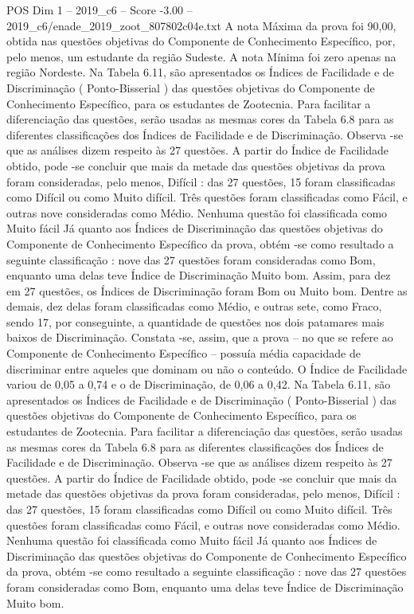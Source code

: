\begin{textsample}{POS Dim 1 – 2019\_c6 – Score -3.00 – 2019\_c6/enade\_2019\_zoot\_807802c04e.txt}
A nota Máxima da prova foi 90,00, obtida nas questões objetivas do Componente de Conhecimento Específico, por, pelo menos, um estudante da região Sudeste.
A nota Mínima foi zero apenas na região Nordeste.
Na Tabela 6.11, são apresentados os Índices de Facilidade e de Discriminação ( Ponto-Bisserial ) das questões objetivas do Componente de Conhecimento Específico, para os estudantes de Zootecnia.
Para facilitar a diferenciação das questões, serão usadas as mesmas cores da Tabela 6.8 para as diferentes classificações dos Índices de Facilidade e de Discriminação.
Observa -se que as análises dizem respeito às 27 questões.
A partir do Índice de Facilidade obtido, pode -se concluir que mais da metade das questões objetivas da prova foram consideradas, pelo menos, Difícil : das 27 questões, 15 foram classificadas como Difícil ou como Muito difícil.
Três questões foram classificadas como Fácil, e outras nove consideradas como Médio.
Nenhuma questão foi classificada como Muito fácil Já quanto aos Índices de Discriminação das questões objetivas do Componente de Conhecimento Específico da prova, obtém -se como resultado a seguinte classificação : nove das 27 questões foram consideradas como Bom, enquanto uma delas teve Índice de Discriminação Muito bom.
Assim, para dez em 27 questões, os Índices de Discriminação foram Bom ou Muito bom.
Dentre as demais, dez delas foram classificadas como Médio, e outras sete, como Fraco, sendo 17, por conseguinte, a quantidade de questões nos dois patamares mais baixos de Discriminação.
Constata -se, assim, que a prova – no que se refere ao Componente de Conhecimento Específico – possuía média capacidade de discriminar entre aqueles que dominam ou não o conteúdo.
O Índice de Facilidade variou de 0,05 a 0,74 e o de Discriminação, de 0,06 a 0,42.
Na Tabela 6.11, são apresentados os Índices de Facilidade e de Discriminação ( Ponto-Bisserial ) das questões objetivas do Componente de Conhecimento Específico, para os estudantes de Zootecnia.
Para facilitar a diferenciação das questões, serão usadas as mesmas cores da Tabela 6.8 para as diferentes classificações dos Índices de Facilidade e de Discriminação.
Observa -se que as análises dizem respeito às 27 questões.
A partir do Índice de Facilidade obtido, pode -se concluir que mais da metade das questões objetivas da prova foram consideradas, pelo menos, Difícil : das 27 questões, 15 foram classificadas como Difícil ou como Muito difícil.
Três questões foram classificadas como Fácil, e outras nove consideradas como Médio.
Nenhuma questão foi classificada como Muito fácil Já quanto aos Índices de Discriminação das questões objetivas do Componente de Conhecimento Específico da prova, obtém -se como resultado a seguinte classificação : nove das 27 questões foram consideradas como Bom, enquanto uma delas teve Índice de Discriminação Muito bom.

\end{textsample}

